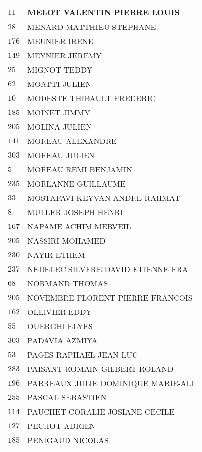 \begin{xltabular}{\linewidth}{|l|X|}
    \hline
    $11$ & MELOT VALENTIN PIERRE LOUIS \\
    \hline
    $28$ & MENARD MATTHIEU STEPHANE \\
    \hline
    $176$ & MEUNIER IRENE \\
    \hline
    $149$ & MEYNIER JEREMY \\
    \hline
    $25$ & MIGNOT TEDDY \\
    \hline
    $62$ & MOATTI JULIEN \\
    \hline
    $10$ & MODESTE THIBAULT FREDERIC \\
    \hline
    $185$ & MOINET JIMMY \\
    \hline
    $205$ & MOLINA JULIEN \\
    \hline
    $141$ & MOREAU ALEXANDRE \\
    \hline
    $303$ & MOREAU JULIEN \\
    \hline
    $5$ & MOREAU REMI BENJAMIN \\
    \hline
    $235$ & MORLANNE GUILLAUME \\
    \hline
    $33$ & MOSTAFAVI KEYVAN ANDRE RAHMAT \\
    \hline
    $8$ & MULLER JOSEPH HENRI \\
    \hline
    $167$ & NAPAME ACHIM MERVEIL \\
    \hline
    $205$ & NASSIRI MOHAMED \\
    \hline
    $230$ & NAYIR ETHEM \\
    \hline
    $237$ & NEDELEC SILVERE DAVID ETIENNE FRA \\
    \hline
    $68$ & NORMAND THOMAS \\
    \hline
    $205$ & NOVEMBRE FLORENT PIERRE FRANCOIS \\
    \hline
    $162$ & OLLIVIER EDDY \\
    \hline
    $55$ & OUERGHI ELYES \\
    \hline
    $303$ & PADAVIA AZMIYA \\
    \hline
    $53$ & PAGES RAPHAEL JEAN LUC \\
    \hline
    $283$ & PAISANT ROMAIN GILBERT ROLAND \\
    \hline
    $196$ & PARREAUX JULIE DOMINIQUE MARIE-ALI \\
    \hline
    $255$ & PASCAL SEBASTIEN \\
    \hline
    $114$ & PAUCHET CORALIE JOSIANE CECILE \\
    \hline
    $127$ & PECHOT ADRIEN \\
    \hline
    $185$ & PENIGAUD NICOLAS \\

\end{xltabular}
